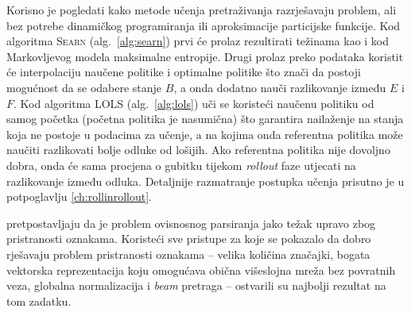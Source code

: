 Korisno je pogledati kako metode učenja pretraživanja razrješavaju problem, ali
bez potrebe dinamičkog programiranja ili aproksimacije particijske funkcije. Kod
algoritma \textsc{Searn} (alg.~\ref{alg:searn}) prvi će prolaz rezultirati
težinama kao i kod Markovljevog modela maksimalne entropije. Drugi prolaz preko
podataka koristit će interpolaciju naučene politike i optimalne politike što znači
da postoji mogućnost da se odabere stanje $B$, a onda dodatno nauči razlikovanje
između $E$ i $F$. Kod algoritma \textsc{LOLS} (alg.~\ref{alg:lols}) uči se
koristeći naučenu politiku od samog početka (početna politika je nasumična) što
garantira nailaženje na stanja koja ne postoje u podacima za učenje, a na kojima
onda referentna politika može naučiti razlikovati bolje odluke od lošijih. Ako
referentna politika nije dovoljno dobra, onda će sama procjena o gubitku tijekom
\textit{rollout} faze utjecati na razlikovanje između odluka. Detaljnije
razmatranje postupka učenja prisutno je u potpoglavlju \ref{ch:rollinrollout}.

\citet{andor2016globally} pretpostavljaju da je problem ovisnosnog parsiranja
jako težak upravo zbog pristranosti oznakama. Koristeći sve pristupe za koje se
pokazalo da dobro rješavaju problem pristranosti oznakama -- velika količina
značajki, bogata vektorska reprezentacija koju omogućava obična višeslojna mreža
bez povratnih veza, globalna normalizacija i \textit{beam} pretraga -- ostvarili
su najbolji rezultat na tom zadatku.
